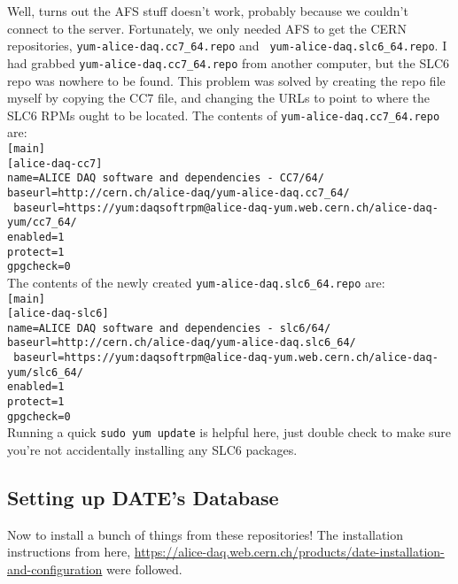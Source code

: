 \documentclass[12pt]{article}
\begin{document}
\qq Well, turns out the AFS stuff doesn't work, probably because we couldn't
connect to the server. Fortunately, we only needed AFS to get the CERN
repositories, {\tt yum-alice-daq.cc7\_64.repo} and {\tt
  yum-alice-daq.slc6\_64.repo}. I had grabbed {\tt yum-alice-daq.cc7\_64.repo}
from another computer, but the SLC6 repo was nowhere to be found. This problem
was solved by creating the repo file myself by copying the CC7 file, and
changing the URLs to point to where the SLC6 RPMs ought to be located. The
contents of {\tt yum-alice-daq.cc7\_64.repo} are: \\
{\tt [main]} \\
{\tt [alice-daq-cc7]} \\
{\tt name=ALICE DAQ software and dependencies - CC7/64/} \\
{\tt baseurl=http://cern.ch/alice-daq/yum-alice-daq.cc7\_64/} \\
{\tt
  baseurl=https://yum:daqsoftrpm@alice-daq-yum.web.cern.ch/alice-daq-yum/cc7\_64/}
\\
{\tt enabled=1} \\
{\tt protect=1} \\
{\tt gpgcheck=0} \\
The contents of the newly created {\tt yum-alice-daq.slc6\_64.repo} are: \\
{\tt [main]} \\
{\tt [alice-daq-slc6]} \\
{\tt name=ALICE DAQ software and dependencies - slc6/64/} \\
{\tt baseurl=http://cern.ch/alice-daq/yum-alice-daq.slc6\_64/} \\
{\tt
  baseurl=https://yum:daqsoftrpm@alice-daq-yum.web.cern.ch/alice-daq-yum/slc6\_64/}
\\
{\tt enabled=1} \\
{\tt protect=1} \\
{\tt gpgcheck=0} \\

Running a quick {\tt sudo yum update} is helpful here, just double check to make
sure you're not accidentally installing any SLC6 packages. 

\subsection{Setting up DATE's Database}

\qq Now to install a bunch of things from these repositories! The installation
instructions from here,
\url{https://alice-daq.web.cern.ch/products/date-installation-and-configuration}
were followed. 
\end{document}
